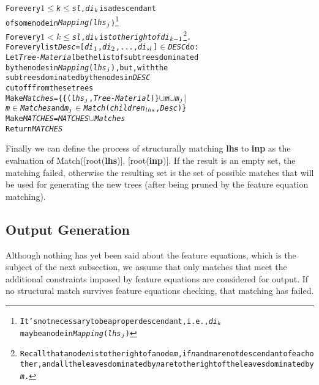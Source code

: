 \begin{alltt}
                                       For every \(1\leq\){\it{}k}\(\leq\){\it{}sl}, {\it{}di}\(\sb{k}\) is a descendant
                                               of some node in {\it{}Mapping(lhs}\(\sb{j}\))\footnote{It's not necessary to be a proper descendant, i.e., {\it{}di}\(\sb{k}\) may be a node in {\it{}Mapping}({\it{}lhs}\(\sb{j}\))}
                             For every \(1<k\leq\){\it{}sl}, {\it{}di}\(\sb{k}\) is {\it{}to the right of} {\it{}di}\(\sb{k-1}\)\footnote{Recall that a node {\it{}n} is to the right of a node {\it{}m}, if {\it{}n} and {\it{}m} are not descendant of each other, and all the leaves dominated by {\it{}n} are to the right of the leaves dominated by {\it{}m}.}.
                      For every list {\it{}Desc} = [{\it{}di}\(\sb{1}\),{\it{}di}\(\sb{2}\),...,{\it{}di}\(\sb{sl}\)] \(\in\) {\it{}DESC} do: 
                          Let {\it{}Tree-Material} be the list of subtrees dominated 
                                   by the nodes in {\it{}Mapping}({\it{}lhs}\(\sb{j}\)), but, with the
                                   subtrees dominated by the nodes in {\it{}DESC}
                                   cut off from these trees 
                          Make {\it{}Matches} = \{ \{({\it{}lhs}\(\sb{j}\), {\it{}Tree-Material})\}\(\cup\){\it{}m}\(\cup\){\it{}m}\(\sb{j}\) \(\mid\)
                                  {\it{}m} \(\in\) {\it{}Matches} and {\it{}m}\(\sb{j}\) \(\in\) {\it{}Match}({\it{}children}\(\sb{lhs}\), {\it{}Desc})\} 
           Make {\it{}MATCHES} = {\it{}MATCHES} \(\cup\) {\it{}Matches}
       Return {\it{}MATCHES}
\end{alltt}

Finally we can define the process of structurally matching {\bf lhs} to
{\bf inp} as the evaluation of Match([root({\bf lhs})], [root({\bf inp})].
If the result is an empty set, the matching failed, otherwise the resulting
set is the set of possible matches that will be used for generating the
new trees (after being pruned by the feature equation matching).

\subsection{Output Generation}
\label{output-gen}

Although nothing has yet been said about the feature
equations, which is the subject of the next subsection, we assume that only
matches that meet the additional constraints imposed by feature equations
are considered for output. If no structural match survives feature equations
checking, that matching has failed.

